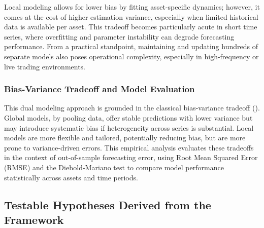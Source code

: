 \documentclass[12pt]{report}
\begin{document}
Local modeling allows for lower bias by fitting asset-specific dynamics; however, it comes at the cost of higher estimation variance, especially when limited historical data is available per asset. This tradeoff becomes particularly acute in short time series, where overfitting and parameter instability can degrade forecasting performance. From a practical standpoint, maintaining and updating hundreds of separate models also poses operational complexity, especially in high-frequency or live trading environments.

\subsubsection{Bias-Variance Tradeoff and Model Evaluation}

This dual modeling approach is grounded in the classical bias-variance tradeoff (\cite{geman_bias_1992}). Global models, by pooling data, offer stable predictions with lower variance but may introduce systematic bias if heterogeneity across series is substantial. Local models are more flexible and tailored, potentially reducing bias, but are more prone to variance-driven errors. This empirical analysis evaluates these tradeoffs in the context of out-of-sample forecasting error, using Root Mean Squared Error (RMSE) and the Diebold-Mariano test to compare model performance statistically across assets and time periods.


\subsection{Testable Hypotheses Derived from the Framework}
\end{document}
